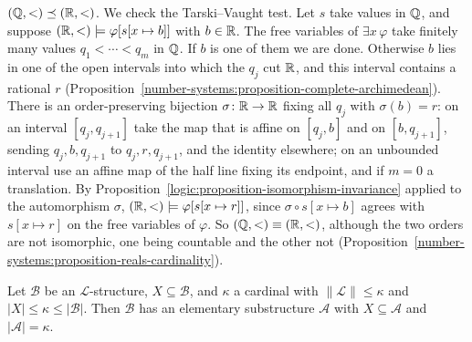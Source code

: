 \begin{example}\label{model-theory:example-rationals-reals}
$(\mathbb{Q}, <) \preceq (\mathbb{R}, <)$. We check the Tarski--Vaught test. Let $s$ take values in $\mathbb{Q}$, and suppose $(\mathbb{R}, <) \models \varphi[s[x \mapsto b]]$ with
$b \in \mathbb{R}$. The free variables of $\exists x\,\varphi$ take finitely many values $q_1 < \cdots < q_m$ in $\mathbb{Q}$. If $b$ is one of them we are done. Otherwise $b$
lies in one of the open intervals into which the $q_j$ cut $\mathbb{R}$, and this interval contains a rational $r$ (Proposition~\ref{number-systems:proposition-complete-archimedean}).
There is an order-preserving bijection $\sigma \colon \mathbb{R} \to \mathbb{R}$ fixing all $q_j$ with $\sigma(b) = r$: on an interval $[q_j, q_{j+1}]$ take the map that is affine on
$[q_j, b]$ and on $[b, q_{j+1}]$, sending $q_j, b, q_{j+1}$ to $q_j, r, q_{j+1}$, and the identity elsewhere; on an unbounded interval use an affine map of the
half line fixing its endpoint, and if $m = 0$ a translation. By Proposition~\ref{logic:proposition-isomorphism-invariance} applied to the automorphism $\sigma$,
$(\mathbb{R}, <) \models \varphi[s[x \mapsto r]]$, since $\sigma \circ s[x \mapsto b]$ agrees with $s[x \mapsto r]$ on the free variables of $\varphi$. So
$(\mathbb{Q}, <) \equiv (\mathbb{R}, <)$, although the two orders are not isomorphic, one being countable and the other not
(Proposition~\ref{number-systems:proposition-reals-cardinality}).
\end{example}

\begin{theorem}\label{model-theory:theorem-downward-lowenheim-skolem}
Let $\mathcal{B}$ be an $\mathcal{L}$-structure, $X \subseteq \mathcal{B}$, and $\kappa$ a cardinal with $\|\mathcal{L}\| \leq \kappa$ and
$|X| \leq \kappa \leq |\mathcal{B}|$. Then $\mathcal{B}$ has an elementary substructure $\mathcal{A}$ with $X \subseteq \mathcal{A}$ and $|\mathcal{A}| = \kappa$.
\end{theorem}

